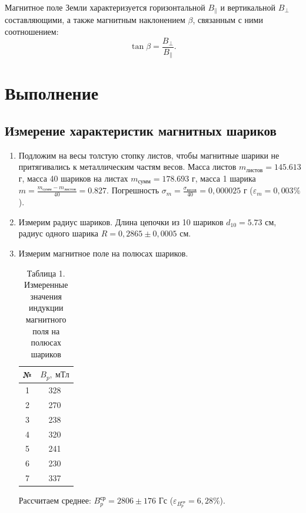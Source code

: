 \documentclass[a4paper]{article}
\begin{document}
Магнитное поле Земли характеризуется горизонтальной \(B_{\parallel}\) и вертикальной \(B_{\perp}\) составляющими, а также магнитным наклонением \(\beta\), связанным с ними соотношением:
\[
\tan \beta = \frac{B_{\perp}}{B_{\parallel}}.
\]
\section{Выполнение}

\subsection*{Измерение характеристик магнитных шариков}

\begin{enumerate}
\item Подложим на весы толстую стопку листов, чтобы магнитные шарики не притягивались к металлическим частям весов. Масса листов $m_{\text{листов}} = 145.613$ г, масса 40 шариков на листах $m_{\text{сумм}} = 178.693$ г, масса 1 шарика $m = \frac{m_{\text{сумм}} - m_{\text{листов}}}{40} = 0.827$. Погрешность $\sigma_m = \frac{\sigma_{\text{весов}}}{40} = 0,000025$ г ($\varepsilon_m = 0,003 \%$).
\item Измерим радиус шариков. Длина цепочки из 10 шариков $d_{10} = 5.73$ см, радиус одного шарика $R = 0,2865 \pm 0,0005$ см.

\item Измерим магнитное поле на полюсах шариков.
\begin{table}[h!]
    \centering
    \begin{tabular}{|c|c|}
        \hline
        № & $B_p,\ \text{мТл}$ \\ \hline
        1 & 328 \\ \hline
        2 & 270 \\ \hline
        3 & 238 \\ \hline
        4 & 320 \\ \hline
        5 & 241 \\ \hline
        6 & 230 \\ \hline
        7 & 337 \\ \hline
    \end{tabular}
    \caption{Таблица 1. Измеренные значения индукции магнитного поля на полюсах шариков}
    \label{tab:Bp_measurements}
\end{table}

Рассчитаем среднее: $B_p^{\text{ср}} = 2806 \pm 176$ Гс ($\varepsilon_{B_p^{\text{ср}}} = 6,28 \%$).


\end{enumerate}
\end{document}
